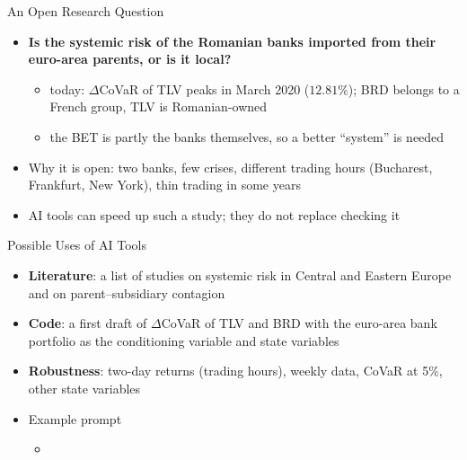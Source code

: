 \begin{frame}{An Open Research Question}
\itemsize{\small}
\begin{itemize}
    \item \textbf{Is the systemic risk of the Romanian banks imported from their euro-area parents, or is it local?}
    \begin{itemize}
        \item today: $\Delta$CoVaR of TLV peaks in March 2020 ($12.81\%$); BRD belongs to a French group, TLV is Romanian-owned
        \item the BET is partly the banks themselves, so a better ``system'' is needed
    \end{itemize}
    \item Why it is open: two banks, few crises, different trading hours (Bucharest, Frankfurt, New York), thin trading in some years
    \item AI tools can speed up such a study; they do not replace checking it 
\end{itemize}
\end{frame}

\begin{frame}{Possible Uses of AI Tools}
\itemsize{\small}
\begin{itemize}
    \item \textbf{Literature}: a list of studies on systemic risk in Central and Eastern Europe and on parent--subsidiary contagion
    \item \textbf{Code}: a first draft of $\Delta$CoVaR of TLV and BRD with the euro-area bank portfolio as the conditioning variable and state variables
    \item \textbf{Robustness}: two-day returns (trading hours), weekly data, CoVaR at 5\%, other state variables
    \item Example prompt
    \begin{itemize}
        \item {}
    \end{itemize}
\end{itemize}
\end{frame}


